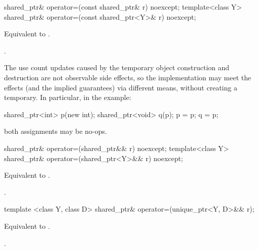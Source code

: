 %
%
\begin{itemdecl}
shared_ptr& operator=(const shared_ptr& r) noexcept;
template<class Y> shared_ptr& operator=(const shared_ptr<Y>& r) noexcept;
\end{itemdecl}

\begin{itemdescr}
\pnum\effects  Equivalent to .

\pnum\returns  {}.

\pnum \enternote
The use count updates caused by the temporary object
construction and destruction are not observable side
effects, so the implementation may meet the effects (and the
implied guarantees) via different means, without creating a
temporary. In particular, in the example:
\begin{codeblock}
shared_ptr<int> p(new int);
shared_ptr<void> q(p);
p = p;
q = p;
\end{codeblock}
both assignments may be no-ops. \exitnote
\end{itemdescr}

%
%
\begin{itemdecl}
shared_ptr& operator=(shared_ptr&& r) noexcept;
template<class Y> shared_ptr& operator=(shared_ptr<Y>&& r) noexcept;
\end{itemdecl}

\begin{itemdescr}
\pnum
\effects Equivalent to .

\pnum
\returns {}.
\end{itemdescr}

%
%
\begin{itemdecl}
template <class Y, class D> shared_ptr& operator=(unique_ptr<Y, D>&& r);
\end{itemdecl}

\begin{itemdescr}
\pnum
\effects Equivalent to .

\pnum
\returns {}.
\end{itemdescr}



